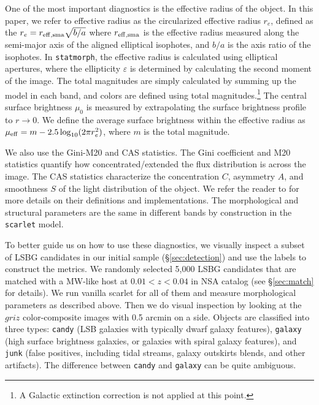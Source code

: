\documentclass[twocolumn,astrosymb,twocolappendix]{aastex631}
\newcommand{\code}[1]{\texttt{#1}}
\begin{document}
\begin{CJK*}{UTF8}{gbsn}
One of the most important diagnostics is the effective radius of the object. In this paper, we refer to effective radius as the circularized effective radius $r_{e}$, defined as the $r_{e} = r_{\rm eff, sma} \sqrt{b/a}$ where $r_{\rm eff, sma}$ is the effective radius measured along the semi-major axis of the aligned elliptical isophotes, and $b/a$ is the axis ratio of the isophotes. In \code{statmorph}, the effective radius is calculated using elliptical apertures, where the ellipticity $\varepsilon$ is determined by calculating the second moment of the image. The total magnitudes are simply calculated by summing up the model in each band, and colors are defined using total magnitudes.\footnote{A Galactic extinction correction is not applied at this point.} The central surface brightness $\mu_0$ is measured by extrapolating the surface brightness profile to $r\to 0$. We define the average surface brightness within the effective radius as $\mu_{\rm eff} = m - 2.5 \log_{10}(2 \pi r_e^2)$, where $m$ is the total magnitude. 

We also use the Gini-M20 and CAS statistics. The Gini coefficient and M20 statistics \citep{Abraham2003,Lotz2004} quantify how concentrated/extended the flux distribution is across the image. The CAS statistics characterize the concentration $C$, asymmetry $A$, and smoothness $S$ of the light distribution of the object. We refer the reader to \citet{statmorph} for more details on their definitions and implementations. The morphological and structural parameters are the same in different bands by construction in the \code{scarlet} model.

To better guide us on how to use these diagnostics, we visually inspect a subset of LSBG candidates in our initial sample (\S \ref{sec:detection}) and use the labels to construct the metrics. We randomly selected 5,000 LSBG candidates that are matched with a MW-like host at $0.01 < z < 0.04$ in NSA catalog (see \S \ref{sec:match} for details). We run vanilla scarlet for all of them and measure morphological parameters as described above. Then we do visual inspection by looking at the $griz$ color-composite images with 0.5 arcmin on a side. Objects are classified into three types: \code{candy} (LSB galaxies with typically dwarf galaxy features), \code{galaxy} (high surface brightness galaxies, or galaxies with spiral galaxy features), and \code{junk} (false positives, including tidal streams, galaxy outskirts blends, and other artifacts). The difference between \code{candy} and \code{galaxy} can be quite ambiguous. 


\end{CJK*}
\end{document}
